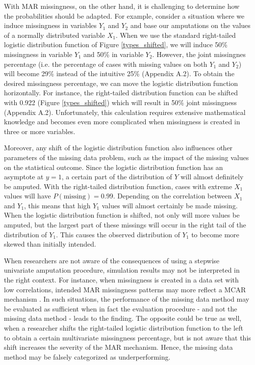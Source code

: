 \documentclass[]{interact}
\begin{document}
With MAR missingness, on the other hand, it is challenging to determine how the probabilities should be adapted. For example, consider a situation where we induce missingness in variables $Y_1$ and $Y_2$ and base our amputations on the values of a normally distributed variable $X_1$. When we use the standard right-tailed logistic distribution function of Figure \ref{types_shifted}, we will induce 50\% missingness in variable $Y_1$ and 50\% in variable $Y_2$. However, the joint missingnes percentage (i.e. the percentage of cases with missing values on both $Y_1$ and $Y_2$) will become 29\% instead of the intuitive 25\% (Appendix A.2). To obtain the desired missingness percentage, we can move the logistic distribution function horizontally. For instance, the right-tailed distribution function can be shifted with 0.922 (Figure \ref{types_shifted}) which will result in 50\% joint missingness (Appendix A.2). Unfortunately, this calculation requires extensive mathematical knowledge and becomes even more complicated when missingness is created in three or more variables. 

Moreover, any shift of the logistic distribution function also influences other parameters of the missing data problem, such as the impact of the missing values on the statistical outcome. Since the logistic distribution function has an asymptote at $y = 1$, a certain part of the distribution of $Y$ will almost definitely be amputed. With the right-tailed distribution function, cases with extreme $X_1$ values will have $P(\text{missing}) = 0.99$. Depending on the correlation between $X_1$ and $Y_1$, this means that high $Y_1$ values will almost certainly be made missing. When the logistic distribution function is shifted, not only will more values be amputed, but the largest part of these missings will occur in the right tail of the distribution of $Y_1$. This causes the observed distribution of $Y_1$ to become more skewed than initially intended. 

When researchers are not aware of the consequences of using a stepwise univariate amputation procedure, simulation results may not be interpreted in the right context. For instance, when missingness is created in a data set with low correlations, intended MAR missingness patterns may more reflect a MCAR mechanism \citep{Vink2016}. In such situations, the performance of the missing data method may be evaluated as sufficient when in fact the evaluation procedure - and not the missing data method - leads to the finding. The opposite could be true as well, when a researcher shifts the right-tailed logistic distribution function to the left to obtain a certain multivariate missingness percentage, but is not aware that this shift increases the severity of the MAR mechanism. Hence, the missing data method may be falsely categorized as underperforming.
\end{document}
